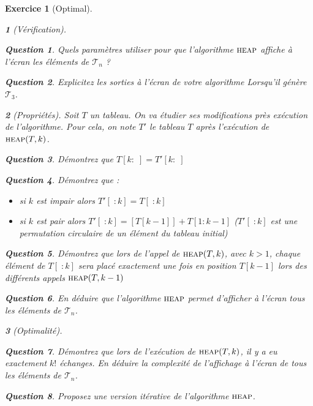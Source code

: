 \documentclass{article}
\theoremstyle{exostyle}
\newtheorem{exo}{Exercice}
\theoremstyle{partiestyle}
\newtheorem{partie}{}[exo]
\theoremstyle{questionstyle}
\newtheorem{questionpartie}{Question}[partie]
\begin{document}
\begin{exo}[Optimal]
    \begin{partie}[Vérification]
        \begin{questionpartie}
            Quels paramètres utiliser pour que l'algorithme $\textsc{heap}$ affiche à l'écran les éléments de $\mathcal{T}_n$ ?
        \end{questionpartie}
        \begin{questionpartie}
            Explicitez les sorties à l'écran de votre algorithme Lorsqu'il génère $\mathcal{T}_3$.
        \end{questionpartie}
    \end{partie}
    \begin{partie}[Propriétés]
        Soit $T$ un tableau. On va étudier ses modifications près exécution de l'algorithme. Pour cela, on note $T'$ le tableau $T$ après l'exécution de $\textsc{heap}(T, k)$.
            \begin{questionpartie}
                Démontrez que  $T[k:\;] = T'[k:\;]$
            \end{questionpartie}
        \begin{questionpartie}
                Démontrez que :
                \begin{itemize}
                    \item si $k$ est impair alors $T'[\;:k] = T[\;:k]$
                    \item si $k$ est pair alors $T'[\;:k] = [T[k-1]] + T[1:k-1]$ ($T'[\;:k]$ est une permutation circulaire de un élément du tableau initial)
            \end{itemize}
        \end{questionpartie}
        \begin{questionpartie}
            Démontrez que lors de l'appel de $\textsc{heap}(T, k)$, avec $k>1$, chaque élément de $T[\;:k]$ sera placé exactement une fois en position $T[k-1]$ lors des différents appels $\textsc{heap}(T, k-1)$
        \end{questionpartie}
        \begin{questionpartie}
            En déduire que l'algorithme $\textsc{heap}$ permet d'afficher à l'écran tous les éléments de $\mathcal{T}_n$.
        \end{questionpartie}
    \end{partie}
    \begin{partie}[Optimalité]
        \begin{questionpartie}
            Démontrez que lors de l'exécution de $\textsc{heap}(T, k)$, il y a eu exactement $k!$ échanges. En déduire la complexité de l'affichage à l'écran de tous les éléments de $\mathcal{T}_n$.
        \end{questionpartie}

        \begin{questionpartie}
            Proposez une version itérative de l'algorithme $\textsc{heap}$.
        \end{questionpartie}

    \end{partie}
\end{exo}
\end{document}
